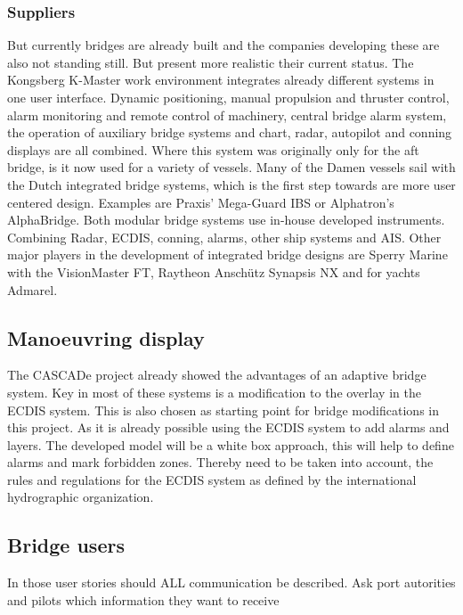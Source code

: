 

\subsubsection{Suppliers}
But currently bridges are already built and the companies developing these are also not standing still. But present more realistic their current status. The Kongsberg K-Master work environment integrates already different systems in one user interface. Dynamic positioning, manual propulsion and thruster control, alarm monitoring and remote control of machinery, central bridge alarm system, the operation of auxiliary bridge systems and chart, radar, autopilot and conning displays are all combined. Where this system was originally only for the aft bridge, is it now used for a variety of vessels. \cite{Kongsberg2017}
Many of the Damen vessels sail with the Dutch integrated bridge systems, which is the first step towards are more user centered design. Examples are Praxis' Mega-Guard IBS or Alphatron's AlphaBridge. Both modular bridge systems use in-house developed instruments. Combining Radar, \ac{ECDIS}, conning, alarms, other ship systems and \ac{AIS}. 
Other major players in the development of integrated bridge designs are Sperry Marine with the VisionMaster FT, Raytheon Anschütz Synapsis NX and for yachts Admarel.\\


\subsection{Manoeuvring display}
The CASCADe project already showed the advantages of an adaptive bridge system. Key in most of these systems is a modification to the overlay in the \ac{ECDIS} system. This is also chosen as starting point for bridge modifications in this project. As it is already possible using the \ac{ECDIS} system to add alarms and layers. The developed model will be a white box approach, this will help to define alarms and mark forbidden zones. Thereby need to be taken into account, the rules and regulations for the \ac{ECDIS} system as defined by the international hydrographic organization.


\subsection{Bridge users}

In those user stories should ALL communication be described. Ask port autorities and pilots which information they want to receive

